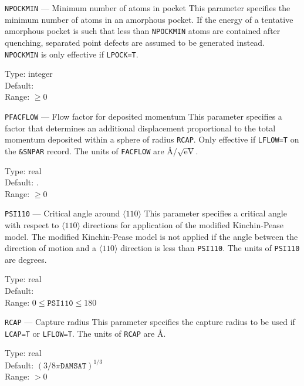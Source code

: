 \begin{keydescription}{\texttt{NPOCKMIN} --- Minimum number of atoms
    in pocket}
%
  This parameter specifies the minimum number of atoms in an amorphous
  pocket.  If the energy of a tentative amorphous pocket is such that
  less than \texttt{NPOCKMIN} atoms are contained after quenching,
  separated point defects are assumed to be generated instead.
  \texttt{NPOCKMIN} is only effective if \texttt{LPOCK=T}.
  \begin{keytab}
     Type:    \> integer \\
     Default:  \\
     Range:   \> $\ge 0$
  \end{keytab}
\end{keydescription}

\ifprivate
\begin{keydescription}{\texttt{PFACFLOW} --- Flow factor for deposited momentum}
%
  This parameter specifies a factor that determines an additional displacement
  proportional to the total momentum deposited within a sphere of radius 
  \texttt{RCAP}. Only effective if \texttt{LFLOW=T} on the \texttt{\&SNPAR}
  record. The units of \texttt{FACFLOW} are \AA/$\sqrt{\mathrm{eV}}$.
  \begin{keytab}
    Type:    \> real \\
    Default: . \\
    Range:   \> $\ge 0$
  \end{keytab}
\end{keydescription}
\fi

\begin{keydescription}{\texttt{PSI110} --- Critical angle around
    $\langle 110 \rangle$}
%
  This parameter specifies a critical angle with respect to 
  $\langle 110 \rangle$ directions for application of the modified Kinchin-Pease
  model.  The modified Kinchin-Pease model is not applied if the angle between 
  the direction of motion and a $\langle 110 \rangle$ direction is less than 
  \texttt{PSI110}.  The units of \texttt{PSI110} are
  degrees.
  \begin{keytab}
    Type:    \> real \\
    Default:  \\
    Range:   \> $0 \le \texttt{PSI110} \le 180$
  \end{keytab}
\end{keydescription}

\begin{keydescription}{\texttt{RCAP} --- Capture radius}
%
  This parameter specifies the capture radius to be used if \texttt{LCAP=T}
  or \texttt{LFLOW=T}.
  The units of \texttt{RCAP} are \AA.
  \begin{keytab}
    Type:    \> real \\
    Default: \> $(3/8 \pi \texttt{DAMSAT})^{1/3}$ \\
    Range:   \> $>0$
  \end{keytab}
\end{keydescription}

